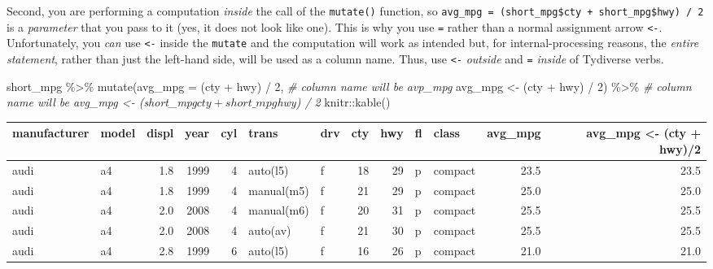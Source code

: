 \documentclass[
]{book}
\newenvironment{Shaded}{\begin{snugshade}}{\end{snugshade}}
\newcommand{\AttributeTok}[1]{\textcolor[rgb]{0.77,0.63,0.00}{#1}}
\newcommand{\CommentTok}[1]{\textcolor[rgb]{0.56,0.35,0.01}{\textit{#1}}}
\newcommand{\DecValTok}[1]{\textcolor[rgb]{0.00,0.00,0.81}{#1}}
\newcommand{\FunctionTok}[1]{\textcolor[rgb]{0.00,0.00,0.00}{#1}}
\newcommand{\NormalTok}[1]{#1}
\newcommand{\OtherTok}[1]{\textcolor[rgb]{0.56,0.35,0.01}{#1}}
\newcommand{\SpecialCharTok}[1]{\textcolor[rgb]{0.00,0.00,0.00}{#1}}
\begin{document}
Second, you are performing a computation \emph{inside} the call of the \texttt{mutate()} function, so \texttt{avg\_mpg\ =\ (short\_mpg\$cty\ +\ short\_mpg\$hwy)\ /\ 2} is a \emph{parameter} that you pass to it (yes, it does not look like one). This is why you use \texttt{=} rather than a normal assignment arrow \texttt{\textless{}-}. Unfortunately, you \emph{can} use \texttt{\textless{}-} inside the \texttt{mutate} and the computation will work as intended but, for internal-processing reasons, the \emph{entire statement}, rather than just the left-hand side, will be used as a column name. Thus, use \texttt{\textless{}-} \emph{outside} and \texttt{=} \emph{inside} of Tydiverse verbs.

\begin{Shaded}
\begin{Highlighting}[]
\NormalTok{short\_mpg }\SpecialCharTok{\%\textgreater{}\%}
  \FunctionTok{mutate}\NormalTok{(}\AttributeTok{avg\_mpg =}\NormalTok{  (cty }\SpecialCharTok{+}\NormalTok{ hwy) }\SpecialCharTok{/} \DecValTok{2}\NormalTok{,      }\CommentTok{\# column name will be avp\_mpg}
\NormalTok{         avg\_mpg }\OtherTok{\textless{}{-}}\NormalTok{ (cty }\SpecialCharTok{+}\NormalTok{ hwy) }\SpecialCharTok{/} \DecValTok{2}\NormalTok{) }\SpecialCharTok{\%\textgreater{}\%} \CommentTok{\# column name will be \textasciigrave{}avg\_mpg \textless{}{-} (short\_mpg$cty + short\_mpg$hwy) / 2\textasciigrave{}}
\NormalTok{  knitr}\SpecialCharTok{::}\FunctionTok{kable}\NormalTok{()}
\end{Highlighting}
\end{Shaded}

\begin{tabular}{l|l|r|r|r|l|l|r|r|l|l|r|r}
\hline
manufacturer & model & displ & year & cyl & trans & drv & cty & hwy & fl & class & avg\_mpg & avg\_mpg <- (cty + hwy)/2\\
\hline
audi & a4 & 1.8 & 1999 & 4 & auto(l5) & f & 18 & 29 & p & compact & 23.5 & 23.5\\
\hline
audi & a4 & 1.8 & 1999 & 4 & manual(m5) & f & 21 & 29 & p & compact & 25.0 & 25.0\\
\hline
audi & a4 & 2.0 & 2008 & 4 & manual(m6) & f & 20 & 31 & p & compact & 25.5 & 25.5\\
\hline
audi & a4 & 2.0 & 2008 & 4 & auto(av) & f & 21 & 30 & p & compact & 25.5 & 25.5\\
\hline
audi & a4 & 2.8 & 1999 & 6 & auto(l5) & f & 16 & 26 & p & compact & 21.0 & 21.0\\
\hline
\end{tabular}
\end{document}
